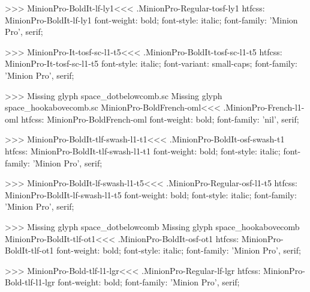{>>>
\<MinionPro-BoldIt-lf-ly1\><<<
.MinionPro-Regular-tosf-ly1
htfcss:  MinionPro-BoldIt-lf-ly1  font-weight: bold; font-style: italic; font-family: 'Minion Pro', serif;

>>>
\<MinionPro-It-tosf-sc-l1-t5\><<<
.MinionPro-BoldIt-tosf-sc-l1-t5
htfcss:  MinionPro-It-tosf-sc-l1-t5  font-style: italic; font-variant: small-caps; font-family: 'Minion Pro', serif;

>>>
Missing glyph	space_dotbelowcomb.sc
Missing glyph	space_hookabovecomb.sc
\<MinionPro-BoldFrench-oml\><<<
.MinionPro-French-l1-oml
htfcss:  MinionPro-BoldFrench-oml  font-weight: bold; font-family: 'nil', serif;

>>>
\<MinionPro-BoldIt-tlf-swash-l1-t1\><<<
.MinionPro-BoldIt-osf-swash-t1
htfcss:  MinionPro-BoldIt-tlf-swash-l1-t1  font-weight: bold; font-style: italic; font-family: 'Minion Pro', serif;

>>>
\<MinionPro-BoldIt-lf-swash-l1-t5\><<<
.MinionPro-Regular-osf-l1-t5
htfcss:  MinionPro-BoldIt-lf-swash-l1-t5  font-weight: bold; font-style: italic; font-family: 'Minion Pro', serif;

>>>
Missing glyph	space_dotbelowcomb
Missing glyph	space_hookabovecomb
\<MinionPro-BoldIt-tlf-ot1\><<<
.MinionPro-BoldIt-osf-ot1
htfcss:  MinionPro-BoldIt-tlf-ot1  font-weight: bold; font-style: italic; font-family: 'Minion Pro', serif;

>>>
\<MinionPro-Bold-tlf-l1-lgr\><<<
.MinionPro-Regular-lf-lgr
htfcss:  MinionPro-Bold-tlf-l1-lgr  font-weight: bold; font-family: 'Minion Pro', serif;

}
